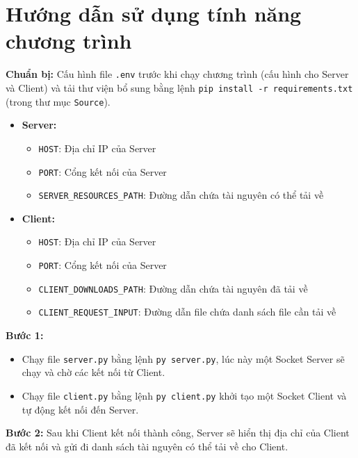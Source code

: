 \documentclass[a4paper,12pt]{report}
\begin{document}
\pagebreak
\section{Hướng dẫn sử dụng tính năng chương trình}
\begin{description}
  \item \textbf{Chuẩn bị:} Cấu hình file \verb|.env| trước khi chạy chương trình (cấu hình cho Server và Client) và tải thư viện bổ sung bằng lệnh \verb|pip install -r requirements.txt| (trong thư mục \verb|Source|).
        \begin{itemize}
          \item \textbf{Server:}
                \begin{itemize}
                  \item \verb|HOST|: Địa chỉ IP của Server
                  \item \verb|PORT|: Cổng kết nối của Server
                  \item \verb|SERVER_RESOURCES_PATH|: Đường dẫn chứa tài nguyên có thể tải về
                \end{itemize}
          \item \textbf{Client:}
                \begin{itemize}
                  \item \verb|HOST|: Địa chỉ IP của Server
                  \item \verb|PORT|: Cổng kết nối của Server
                  \item \verb|CLIENT_DOWNLOADS_PATH|: Đường dẫn chứa tài nguyên đã tải về
                  \item \verb|CLIENT_REQUEST_INPUT|: Đường dẫn file chứa danh sách file cần tải về
                \end{itemize}
        \end{itemize}
  \item \textbf{Bước 1:}
        \begin{itemize}
          \item Chạy file \verb|server.py| bằng lệnh \verb|py server.py|, lúc này một Socket Server sẽ chạy và chờ các kết nối từ Client.
          \item Chạy file \verb|client.py| bằng lệnh \verb|py client.py| khởi tạo một Socket Client và tự động kết nối đến Server.
        \end{itemize}
  \item \textbf{Bước 2:} Sau khi Client kết nối thành công, Server sẽ hiển thị địa chỉ của Client đã kết nối và gửi đi danh sách tài nguyên có thể tải về cho Client.

\end{description}
\end{document}
